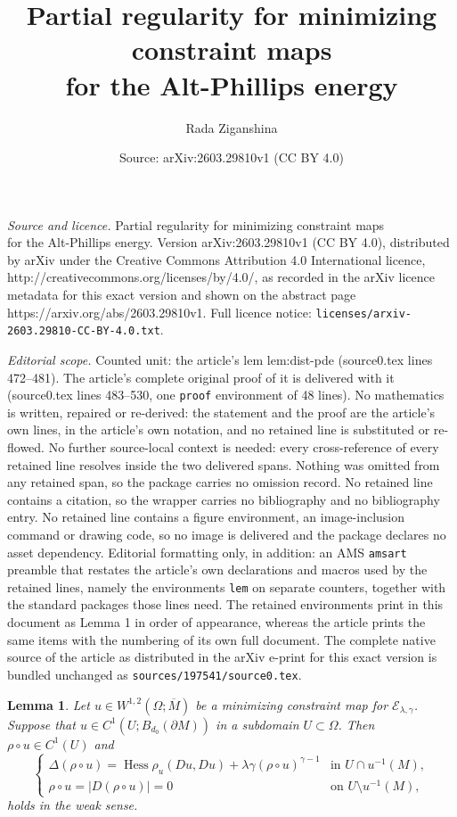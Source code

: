 \documentclass[10pt,a4paper]{amsart}
\title{Partial regularity for minimizing constraint maps \\ for the Alt-Phillips energy}
\author{Rada Ziganshina}
\date{Source: arXiv:2603.29810v1 (CC BY 4.0)}
\newtheorem{lem}{Lemma}
\newcommand{\Hess}{\operatorname{Hess}}
\newcommand{\cE}{{\mathcal E}}
\begin{document}
\maketitle

\noindent\emph{Source and licence.} Partial regularity for minimizing constraint maps \\ for the Alt-Phillips energy. Version arXiv:2603.29810v1 (CC BY 4.0), distributed by arXiv under the Creative Commons Attribution 4.0 International licence, http://creativecommons.org/licenses/by/4.0/, as recorded in the arXiv licence metadata for this exact version and shown on the abstract page https://arxiv.org/abs/2603.29810v1. Full licence notice: \texttt{licenses/arxiv-2603.29810-CC-BY-4.0.txt}.\par\smallskip

\noindent\textit{Editorial scope.} Counted unit: the article's lem lem:dist-pde (source0.tex lines 472--481). The article's complete original proof of it is delivered with it (source0.tex lines 483--530, one \texttt{proof} environment of 48 lines). No mathematics is written, repaired or re-derived: the statement and the proof are the article's own lines, in the article's own notation, and no retained line is substituted or re-flowed.  No further source-local context is needed: every cross-reference of every retained line resolves inside the two delivered spans.  Nothing was omitted from any retained span, so the package carries no omission record.  No retained line contains a citation, so the wrapper carries no bibliography and no bibliography entry.  No retained line contains a figure environment, an image-inclusion command or drawing code, so no image is delivered and the package declares no asset dependency.  Editorial formatting only, in addition: an AMS \texttt{amsart} preamble that restates the article's own declarations and macros used by the retained lines, namely the environments \texttt{lem} on separate counters, together with the standard packages those lines need.  The retained environments print in this document as Lemma 1 in order of appearance, whereas the article prints the same items with the numbering of its own full document.  The complete native source of the article as distributed in the arXiv e-print for this exact version is bundled unchanged as \texttt{sources/197541/source0.tex}.
\begin{lem}\label{lem:dist-pde}
    Let $u\in W^{1,2}(\Omega;\overline M)$ be a minimizing constraint map for $\cE_{\lambda,\gamma}$. Suppose that $u\in C^1(U;{B_{d_0}(\partial M)})$ in a subdomain $U\subset\Omega$. Then $\rho\circ u \in C^1(U)$ and  
\begin{equation}\label{eq:dist-pde}
\begin{cases}
\Delta(\rho\circ u) = \Hess\rho_u(Du,Du) + \lambda\gamma(\rho\circ u)^{\gamma-1} & \text{in }U\cap u^{-1}(M), \\
\rho\circ u = |D(\rho\circ u)| = 0 & \text{on }U\setminus u^{-1}(M),
\end{cases}
\end{equation}
holds in the weak sense.  
\end{lem}
\end{document}
